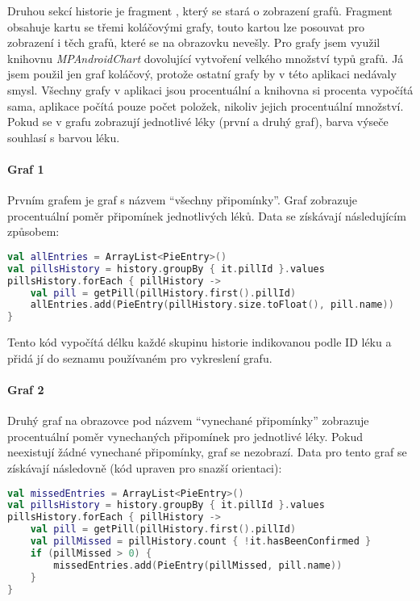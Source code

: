 \documentclass[../TakeYourPill.tex]{subfiles}
\begin{document}
Druhou sekcí historie je fragment , který se stará o zobrazení grafů. Fragment obsahuje kartu se třemi koláčovými grafy, touto kartou lze posouvat pro zobrazení i těch grafů, které se na obrazovku nevešly. Pro grafy jsem využil knihovnu \textit{MPAndroidChart} \cite{chart} dovolující vytvoření velkého množství typů grafů. Já jsem použil jen graf koláčový, protože ostatní grafy by v této aplikaci nedávaly smysl. Všechny grafy v aplikaci jsou procentuální a knihovna si procenta vypočítá sama, aplikace počítá pouze počet položek, nikoliv jejich procentuální množství. Pokud se v grafu zobrazují jednotlivé léky (první a druhý graf), barva výseče souhlasí s barvou léku. 

\paragraph{Graf 1} Prvním grafem je graf s názvem \enquote{všechny připomínky}. Graf zobrazuje procentuální poměr připomínek jednotlivých léků. Data se získávají následujícím způsobem:

\begin{lstlisting}[language=Kotlin]
val allEntries = ArrayList<PieEntry>()
val pillsHistory = history.groupBy { it.pillId }.values
pillsHistory.forEach { pillHistory ->
    val pill = getPill(pillHistory.first().pillId)
    allEntries.add(PieEntry(pillHistory.size.toFloat(), pill.name))
}
\end{lstlisting}

Tento kód vypočítá délku každé skupinu historie indikovanou podle ID léku a přidá jí do seznamu používaném pro vykreslení grafu.


\paragraph{Graf 2} Druhý graf na obrazovce pod názvem \enquote{vynechané připomínky} zobrazuje procentuální poměr vynechaných připomínek pro jednotlivé léky. Pokud neexistují žádné vynechané připomínky, graf se nezobrazí. Data pro tento graf se získávají následovně (kód upraven pro snazší orientaci):

\begin{lstlisting}[language=Kotlin]
val missedEntries = ArrayList<PieEntry>()
val pillsHistory = history.groupBy { it.pillId }.values
pillsHistory.forEach { pillHistory ->
    val pill = getPill(pillHistory.first().pillId)
    val pillMissed = pillHistory.count { !it.hasBeenConfirmed }
    if (pillMissed > 0) {
        missedEntries.add(PieEntry(pillMissed, pill.name))
    }
}
\end{lstlisting}
\end{document}
